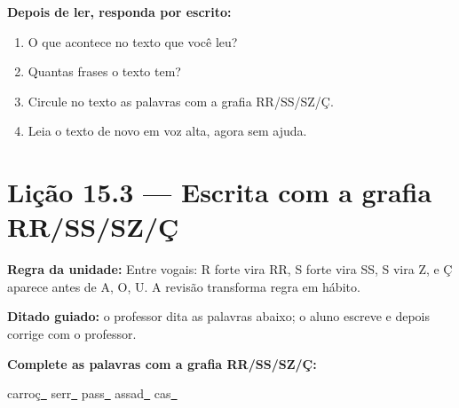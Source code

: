 \textbf{Depois de ler, responda por escrito:}
\begin{enumerate}

  \item O que acontece no texto que você leu?
  \begin{center}
  \underline{\hspace{12cm}}
  \end{center}

  \item Quantas frases o texto tem?
  \begin{center}
  \underline{\hspace{12cm}}
  \end{center}

  \item Circule no texto as palavras com a grafia RR/SS/SZ/Ç.

  \item Leia o texto de novo em voz alta, agora sem ajuda.

\end{enumerate}

\section{Lição 15.3 --- Escrita com a grafia RR/SS/SZ/Ç}

\noindent\textbf{Regra da unidade:} Entre vogais: R forte vira RR, S forte vira SS, S vira Z, e Ç aparece antes de A, O, U. A revisão transforma regra em hábito.


\noindent\textbf{Ditado guiado:} o professor dita as palavras abaixo; o aluno escreve e depois corrige com o professor.

\begin{center}
  \underline{\hspace{2.3cm}} \quad \underline{\hspace{2.3cm}} \quad \underline{\hspace{2.3cm}} \quad \underline{\hspace{2.3cm}}

  \underline{\hspace{2.3cm}} \quad \underline{\hspace{2.3cm}} \quad \underline{\hspace{2.3cm}} \quad \underline{\hspace{2.3cm}}
\end{center}

\noindent\textbf{Complete as palavras com a grafia RR/SS/SZ/Ç:}
\begin{center}
  carroç\underline{~} \quad serr\underline{~} \quad pass\underline{~} \quad assad\underline{~} \quad cas\underline{~}
\end{center}

